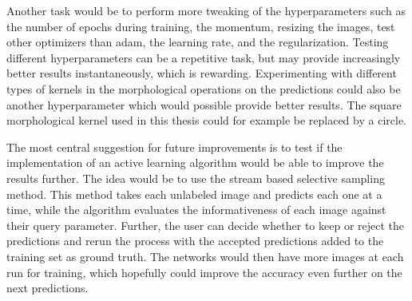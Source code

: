 \documentclass[USenglish]{ifimaster}  %
\begin{document}
Another task would be to perform more tweaking of the hyperparameters such as the number of epochs during training, the momentum, resizing the images, test other optimizers than adam, the learning rate, and the regularization. Testing different hyperparameters can be a repetitive task, but may provide increasingly better results instantaneously, which is rewarding. Experimenting with different types of kernels in the morphological operations on the predictions could also be another hyperparameter which would possible provide better results. The square morphological kernel used in this thesis could for example be replaced by a circle.

The most central suggestion for future improvements is to test if the implementation of an active learning algorithm would be able to improve the results further. The idea would be to use the stream based selective sampling method. This method takes each unlabeled image and predicts each one at a time, while the algorithm evaluates the informativeness of each image against their query parameter. Further, the user can decide whether to keep or reject the predictions and rerun the process with the accepted predictions added to the training set as ground truth. The networks would then have more images at each run for training, which hopefully could improve the accuracy even further on the next predictions.
\end{document}
